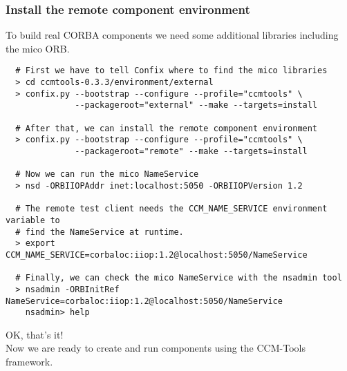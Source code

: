 \subsubsection{Install the remote component environment}
To build real CORBA components we need some additional libraries including the 
mico ORB.  
\begin{small}
\begin{verbatim}
  # First we have to tell Confix where to find the mico libraries
  > cd ccmtools-0.3.3/environment/external
  > confix.py --bootstrap --configure --profile="ccmtools" \
              --packageroot="external" --make --targets=install    

  # After that, we can install the remote component environment 
  > confix.py --bootstrap --configure --profile="ccmtools" \
              --packageroot="remote" --make --targets=install

  # Now we can run the mico NameService
  > nsd -ORBIIOPAddr inet:localhost:5050 -ORBIIOPVersion 1.2

  # The remote test client needs the CCM_NAME_SERVICE environment variable to 
  # find the NameService at runtime.
  > export CCM_NAME_SERVICE=corbaloc:iiop:1.2@localhost:5050/NameService

  # Finally, we can check the mico NameService with the nsadmin tool
  > nsadmin -ORBInitRef NameService=corbaloc:iiop:1.2@localhost:5050/NameService
    nsadmin> help
\end{verbatim}
\end{small}

OK, that's it! \\
Now we are ready to create and run components using the CCM-Tools framework.
